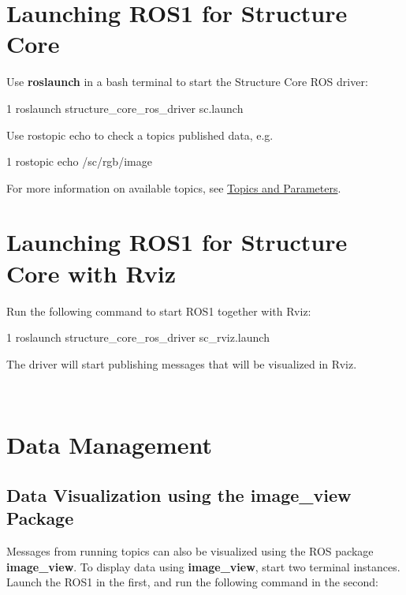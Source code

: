 \hypertarget{ros_start_launch_ros1}{}\section{Launching R\+O\+S1 for Structure Core}\label{ros_start_launch_ros1}
Use {\bfseries roslaunch} in a bash terminal to start the Structure Core R\+OS driver\+:


\begin{DoxyCode}
1 roslaunch structure\_core\_ros\_driver sc.launch
\end{DoxyCode}


Use {\ttfamily rostopic echo} to check a topic\textquotesingle{}s published data, e.\+g.


\begin{DoxyCode}
1 rostopic echo /sc/rgb/image
\end{DoxyCode}


For more information on available topics, see \hyperlink{ros_main_features_published_topics}{Topics and Parameters}.\hypertarget{ros_start_launch_ros1_rviz}{}\section{Launching R\+O\+S1 for Structure Core with Rviz}\label{ros_start_launch_ros1_rviz}
Run the following command to start R\+O\+S1 together with Rviz\+:


\begin{DoxyCode}
1 roslaunch structure\_core\_ros\_driver sc\_rviz.launch
\end{DoxyCode}


The driver will start publishing messages that will be visualized in Rviz.



~\newline
\hypertarget{ros_start_data_management}{}\section{Data Management}\label{ros_start_data_management}
\hypertarget{ros_start_image_view}{}\subsection{Data Visualization using the image\+\_\+view Package}\label{ros_start_image_view}
Messages from running topics can also be visualized using the R\+OS package {\bfseries image\+\_\+view}. To display data using {\bfseries image\+\_\+view}, start two terminal instances. Launch the R\+O\+S1 in the first, and run the following command in the second\+:


